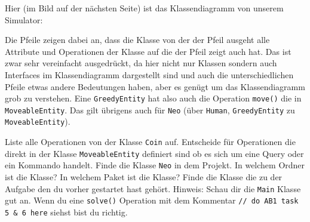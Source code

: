 


Hier (im Bild auf der nächsten Seite) ist das Klassendiagramm von unserem Simulator:

    Die Pfeile zeigen dabei an, dass die Klasse von der der Pfeil ausgeht alle Attribute und Operationen der Klasse auf die der Pfeil zeigt auch hat.
    Das ist zwar sehr vereinfacht ausgedrückt, da hier nicht nur Klassen sondern auch Interfaces im Klassendiagramm dargestellt sind und auch die unterschiedlichen Pfeile etwas andere Bedeutungen haben, aber es genügt um das Klassendiagramm grob zu verstehen.
    Eine \texttt{GreedyEntity} hat also auch die Operation \texttt{move()} die in \texttt{MoveableEntity}.
    Das gilt übrigens auch für \texttt{Neo} (über \texttt{Human}, \texttt{GreedyEntity} zu \texttt{MoveableEntity}).


        \subexcercise Liste alle Operationen von der Klasse \texttt{Coin} auf.
        \subexcercise Entscheide für Operationen die direkt in der Klasse \texttt{MoveableEntity} definiert sind ob es sich um eine Query oder ein Kommando handelt.
        \subexcercise Finde die Klasse \texttt{Neo} in dem Projekt.
            In welchem Ordner ist die Klasse?
            In welchem Paket ist die Klasse?
        \subexcercise Finde die Klasse die zu der Aufgabe  den du vorher gestartet hast gehört.
            Hinweis: Schau dir die \texttt{Main} Klasse gut an.
            Wenn du eine \texttt{solve()} Operation mit dem Kommentar \texttt{// do AB1 task 5 \& 6 here} siehst bist du richtig.


